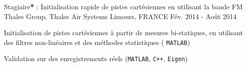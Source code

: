 \begin{cventries}

\cventry
{Stagiaire\textbf{*} : Initialisation rapide de pistes cartésiennes en utilisant la bande FM} %
{Thales Group, Thales Air Systems} %
{Limours, FRANCE} %
{Fév. 2014 - Août 2014} %
{ %
\begin{cvitems}
\item {Initialisation de pistes cartésiennes à partir de mesures bi-statiques, en utilisant des filtres non-linéaires et des méthodes statistiques ( \texttt{MATLAB})}
\item {Validation sur des enregistrements réels (\texttt{MATLAB}, \texttt{C++}, \texttt{Eigen})}
\end{cvitems}
}
\end{cventries}
